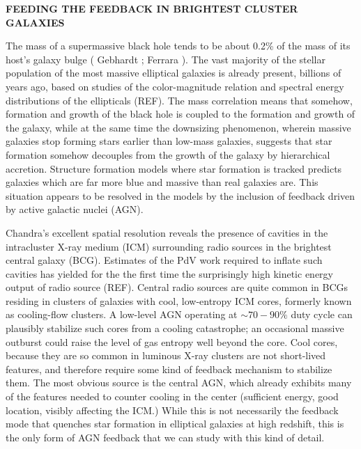 \documentclass[letterpaper,11pt]{article}
\begin{document}
\pagestyle{plain}


 

\begin{center} 
\bfseries\uppercase{%
Feeding the Feedback in Brightest Cluster Galaxies
}
\end{center}






The mass of a supermassive black hole tends to be about 0.2\% of the
mass of its host's galaxy bulge ( Gebhardt ; Ferrara ). The vast
majority of the stellar population of the most massive elliptical
galaxies is already present, billions of years ago, based on studies
of the color-magnitude relation and spectral energy distributions of
the ellipticals (REF). The mass correlation means that somehow,
formation and growth of the black hole is coupled to the formation and
growth of the galaxy, while at the same time the downsizing
phenomenon, wherein massive galaxies stop forming stars earlier than
low-mass galaxies, suggests that star formation somehow decouples from
the growth of the galaxy by hierarchical accretion. Structure
formation models where star formation is tracked predicts galaxies
which are far more blue and massive than real galaxies are. This
situation appears to be resolved in the models by the inclusion of
feedback driven by active galactic nuclei (AGN). 

Chandra's excellent spatial resolution reveals the presence of
cavities in the intracluster X-ray medium (ICM) surrounding radio
sources in the brightest central galaxy (BCG). Estimates of the PdV
work required to inflate such cavities has yielded for the the first
time the surprisingly high kinetic energy output of radio source
(REF). Central radio sources are quite common in BCGs residing in
clusters of galaxies with cool, low-entropy ICM cores, formerly known
as cooling-flow clusters. A low-level AGN operating at $\sim70-90\%$
duty cycle can plausibly stabilize such cores from a cooling
catastrophe; an occasional massive outburst could raise the level of
gas entropy well beyond the core. Cool cores, because they are so
common in luminous X-ray clusters are not short-lived features, and
therefore require some kind of feedback mechanism to stabilize
them. The most obvious source is the central AGN, which already
exhibits many of the features needed to counter cooling in the center
(sufficient energy, good location, visibly affecting the ICM.) While
this is not necessarily the feedback mode that quenches star
formation in elliptical galaxies at high redshift, this is the only
form of AGN feedback that we can study with this kind of detail.
\end{document}
